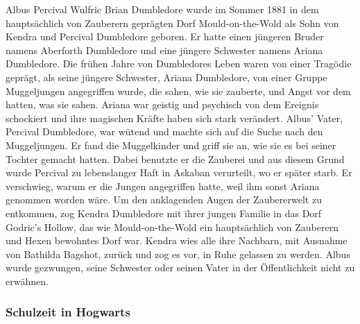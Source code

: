 \documentclass[a4paper, 10pt]{article}
\begin{document}
Albus Percival Wulfric Brian Dumbledore wurde im Sommer 1881 in dem hauptsächlich von Zauberern geprägten Dorf Mould-on-the-Wold als Sohn von Kendra und Percival Dumbledore geboren. Er hatte einen jüngeren Bruder namens Aberforth Dumbledore und eine jüngere Schwester namens Ariana Dumbledore. Die frühen Jahre von Dumbledores Leben waren von einer Tragödie geprägt, als seine jüngere Schwester, Ariana Dumbledore, von einer Gruppe Muggeljungen angegriffen wurde, die sahen, wie sie zauberte, und Angst vor dem hatten, was sie sahen.
\vspace{10pt}
\newline
Ariana war geistig und psychisch von dem Ereignis schockiert und ihre magischen Kräfte haben sich stark verändert. Albus' Vater, Percival Dumbledore, war wütend und machte sich auf die Suche nach den Muggeljungen. Er fand die Muggelkinder und griff sie an, wie sie es bei seiner Tochter gemacht hatten. Dabei benutzte er die Zauberei und aus diesem Grund wurde Percival zu lebenslanger Haft in Askaban verurteilt, wo er später starb. Er verschwieg, warum er die Jungen angegriffen hatte, weil ihm sonst Ariana genommen worden wäre.
\vspace{10pt}
\newline
Um den anklagenden Augen der Zaubererwelt zu entkommen, zog Kendra Dumbledore mit ihrer jungen Familie in das Dorf Godric's Hollow, das wie Mould-on-the-Wold ein hauptsächlich von Zauberern und Hexen bewohntes Dorf war. Kendra wies alle
ihre Nachbarn, mit Ausnahme von Bathilda Bagshot, zurück und zog es vor, in Ruhe gelassen zu werden. Albus wurde gezwungen, seine Schwester oder seinen Vater in der Öffentlichkeit nicht zu erwähnen.

\subsubsection*{\large Schulzeit in Hogwarts}
\end{document}
